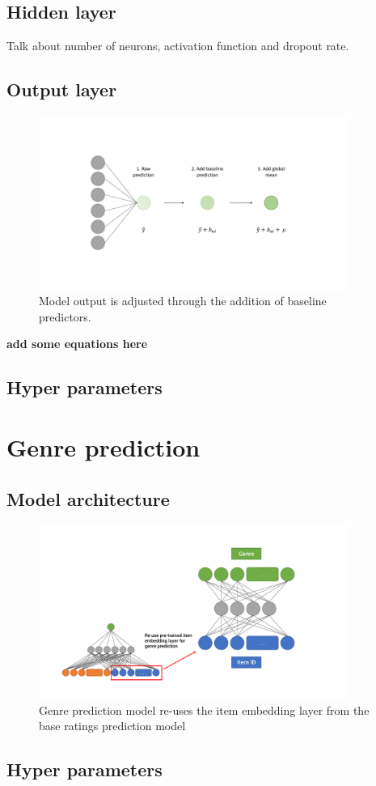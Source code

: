 \subsection{Hidden layer}
Talk about number of neurons, activation function and dropout rate.

\subsection{Output layer}
\begin{figure}[H]
\centering
\includegraphics[width=0.9\textwidth]{Figures/4_CGT-output-layer.pdf}
\decoRule
\caption[Rating layer]{Model output is adjusted through the addition of baseline predictors.}
\label{fig:4_CGT-rating-layer}
\end{figure}

\textbf{add some equations here}

\subsection{Hyper parameters}

\section{Genre prediction}

\subsection{Model architecture}
\begin{figure}[H]
\centering
\includegraphics[width=0.9\textwidth]{Figures/4_genre-model.pdf}
\decoRule
\caption[Genre prediction model]{Genre prediction model re-uses the item embedding layer from the base ratings prediction model}
\label{fig:4_genre-prediction-architecture}
\end{figure}

\subsection{Hyper parameters}